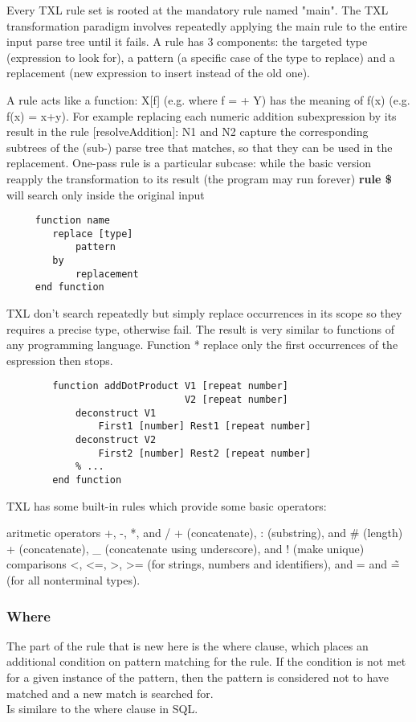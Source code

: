 	Every TXL rule set is rooted at the mandatory rule named "main". The TXL transformation paradigm involves repeatedly applying the main rule to the entire input parse tree until it fails. A rule has 3 components: the targeted type (expression to look for), a pattern (a specific case of the type to replace) and a replacement (new expression to insert instead of the old one).
	
	A rule acts like a function: X[f] (e.g. where f = + Y) has the meaning of f(x) (e.g. f(x) = x+y). For example replacing each numeric addition subexpression by its result in the rule [resolveAddition]: N1 and N2 capture the corresponding subtrees of the (sub-) parse tree that matches, so that they can be used in the replacement. One-pass rule is a particular subcase: while the basic version reapply the transformation to its result (the program may run forever) \textbf{rule \$} will search only inside the original input
	
	\begin{lstlisting}
	 function name
	 	replace [type]
	 		pattern
	 	by
	 		replacement
	 end function
	\end{lstlisting}
	
	TXL don't search repeatedly but simply replace occurrences in its scope so they requires a precise type, otherwise fail. The result is very similar to functions of any programming language. Function * replace only the first occurrences of the espression then stops.
	
	\begin{lstlisting}
		function addDotProduct V1 [repeat number] 
		                       V2 [repeat number]
		    deconstruct V1
		        First1 [number] Rest1 [repeat number]
		    deconstruct V2
		        First2 [number] Rest2 [repeat number]
		    % ...
		end function
	\end{lstlisting}
	
	TXL has some built-in rules which provide some basic operators:
	\begin{itemize}
		 aritmetic operators +, -, *, and /
		 + (concatenate), : (substring), and \# (length)
		 + (concatenate), \_ (concatenate using underscore), and ! (make unique)
		 comparisons \textless, \textless=, \textgreater, \textgreater= (for strings, numbers and identifiers), and = and \~= (for all nonterminal types).
	\end{itemize}
	
		\subsubsection{Where}
		The part of the rule that is new here is the where clause, which places an additional condition on pattern matching for the rule. If the condition is not met for a given instance of the pattern, then the pattern is considered not to have matched and a new match is searched for.\\
		Is similare to the where clause in SQL.
		
